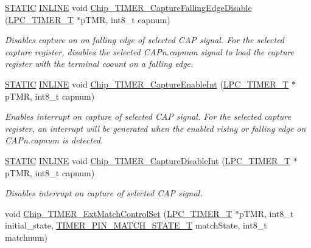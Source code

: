 \begin{DoxyCompactItemize}
\hyperlink{group___l_p_c___types___public___macros_ga10b2d890d871e1489bb02b7e70d9bdfb}{S\+T\+A\+T\+IC} \hyperlink{spifi__18xx__43xx_8h_a2eb6f9e0395b47b8d5e3eeae4fe0c116}{I\+N\+L\+I\+NE} void \hyperlink{group___t_i_m_e_r__18_x_x__43_x_x_ga521a3308abdffb693f4785b739dae98f}{Chip\+\_\+\+T\+I\+M\+E\+R\+\_\+\+Capture\+Falling\+Edge\+Disable} (\hyperlink{struct_l_p_c___t_i_m_e_r___t}{L\+P\+C\+\_\+\+T\+I\+M\+E\+R\+\_\+T} $\ast$p\+T\+MR, int8\+\_\+t capnum)
\begin{DoxyCompactList}\small\item\em Disables capture on on falling edge of selected C\+AP signal. For the selected capture register, disables the selected C\+A\+Pn.\+capnum signal to load the capture register with the terminal coount on a falling edge. \end{DoxyCompactList}\item 
\hyperlink{group___l_p_c___types___public___macros_ga10b2d890d871e1489bb02b7e70d9bdfb}{S\+T\+A\+T\+IC} \hyperlink{spifi__18xx__43xx_8h_a2eb6f9e0395b47b8d5e3eeae4fe0c116}{I\+N\+L\+I\+NE} void \hyperlink{group___t_i_m_e_r__18_x_x__43_x_x_ga141861bd1b18812fcfd231b8a42065d8}{Chip\+\_\+\+T\+I\+M\+E\+R\+\_\+\+Capture\+Enable\+Int} (\hyperlink{struct_l_p_c___t_i_m_e_r___t}{L\+P\+C\+\_\+\+T\+I\+M\+E\+R\+\_\+T} $\ast$p\+T\+MR, int8\+\_\+t capnum)
\begin{DoxyCompactList}\small\item\em Enables interrupt on capture of selected C\+AP signal. For the selected capture register, an interrupt will be generated when the enabled rising or falling edge on C\+A\+Pn.\+capnum is detected. \end{DoxyCompactList}\item 
\hyperlink{group___l_p_c___types___public___macros_ga10b2d890d871e1489bb02b7e70d9bdfb}{S\+T\+A\+T\+IC} \hyperlink{spifi__18xx__43xx_8h_a2eb6f9e0395b47b8d5e3eeae4fe0c116}{I\+N\+L\+I\+NE} void \hyperlink{group___t_i_m_e_r__18_x_x__43_x_x_ga75d24b5365354b481b285c7c718f3791}{Chip\+\_\+\+T\+I\+M\+E\+R\+\_\+\+Capture\+Disable\+Int} (\hyperlink{struct_l_p_c___t_i_m_e_r___t}{L\+P\+C\+\_\+\+T\+I\+M\+E\+R\+\_\+T} $\ast$p\+T\+MR, int8\+\_\+t capnum)
\begin{DoxyCompactList}\small\item\em Disables interrupt on capture of selected C\+AP signal. \end{DoxyCompactList}\item 
void \hyperlink{group___t_i_m_e_r__18_x_x__43_x_x_gaf58d175fd6011349b7331055422b9e28}{Chip\+\_\+\+T\+I\+M\+E\+R\+\_\+\+Ext\+Match\+Control\+Set} (\hyperlink{struct_l_p_c___t_i_m_e_r___t}{L\+P\+C\+\_\+\+T\+I\+M\+E\+R\+\_\+T} $\ast$p\+T\+MR, int8\+\_\+t initial\+\_\+state, \hyperlink{group___t_i_m_e_r__18_x_x__43_x_x_ga15be0f559655d587ad466689f639ab72}{T\+I\+M\+E\+R\+\_\+\+P\+I\+N\+\_\+\+M\+A\+T\+C\+H\+\_\+\+S\+T\+A\+T\+E\+\_\+T} match\+State, int8\+\_\+t matchnum)

\end{DoxyCompactItemize}
